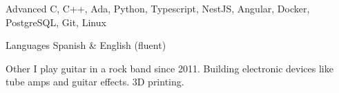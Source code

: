 
\begin{cvskills}

  \cvskill
    {Advanced}
    {C, C++, Ada, Python, Typescript, NestJS, Angular, Docker, PostgreSQL, Git, Linux}

  \cvskill
    {Languages}
    {Spanish \& English (fluent)}

  \cvskill
    {Other}
    {I play guitar in a rock band since 2011. Building electronic devices like tube amps and guitar effects. 3D printing.}

\end{cvskills}
